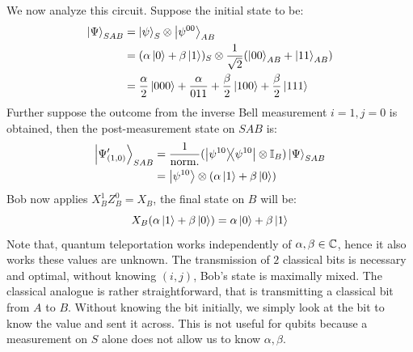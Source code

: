 We now analyze this circuit. Suppose the initial state to be:
\begin{align*}
    \ket{\Psi}_{SAB} &= \ket{\psi}_S \otimes \ket{\psi^{00}}_{AB} \\
    &= (\alpha \ket{0} + \beta \ket{1})_S \otimes \frac{1}{\sqrt{2}}(\ket{00}_{AB} + \ket{11}_{AB}) \\
    &= \frac{\alpha}{2}\ket{000} + \frac{\alpha}{011} + \frac{\beta}{2}\ket{100} + \frac{\beta}{2}\ket{111}
\end{align*}
Further suppose the outcome from the inverse Bell measurement $i = 1, j = 0$ is obtained, then the post-measurement state on $SAB$ is:
\begin{align*}
    \ket{\Psi_{(1, 0)}'}_{SAB} &= \frac{1}{\text{norm.}}(\dyad{\psi^{10}}\otimes \id_B)\ketPsi_{SAB} \\
    &= \ket{\psi^{10}} \otimes (\alpha \ket{1} + \beta\ket{0})
\end{align*}
Bob now applies $X_B^1Z_B^0 = X_B$, the final state on $B$ will be:
$$X_B(\alpha \ket{1} + \beta\ket{0}) = \alpha \ket{0} + \beta\ket{1}$$
Note that, quantum teleportation works independently of $\alpha, \beta \in \mathbb{C}$, hence it also works these values are unknown. The transmission of $2$ classical bits is necessary and optimal, without knowing $(i, j)$, Bob's state is maximally mixed. The classical analogue is rather straightforward, that is transmitting a classical bit from $A$ to $B$. Without knowing the bit initially, we simply look at the bit to know the value and sent it across. This is not useful for qubits because a measurement on $S$ alone does not allow us to know $\alpha, \beta$.


